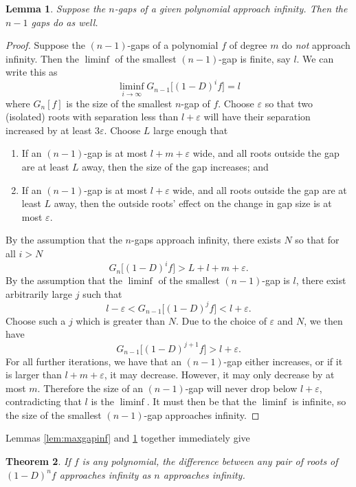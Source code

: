 \documentclass[11pt]{article}
\newtheorem{theorem}{Theorem}[section]
\newtheorem{lemma}[theorem]{Lemma}
\newcommand{\e}{\varepsilon}
\begin{document}
\begin{lemma}
\label{lem:gapinduction}
	Suppose the $n$-gaps of a given polynomial approach infinity. Then the $n-1$ gaps do as well.
\end{lemma}
\begin{proof}
	Suppose the $(n-1)$-gaps of a polynomial $f$ of degree $m$ do \emph{not} approach infinity. Then the $\liminf$ of the smallest $(n-1)$-gap is finite, say $l$. We can write this as
		\[ \liminf_{i\to\infty} G_{n-1}\big[(1-D)^i f\big] = l \]
	where $G_n[f]$ is the size of the smallest $n$-gap of $f$. Choose $\e$ so that two (isolated) roots with separation less than $l+\e$ will have their separation increased by at least $3\e$. Choose $L$ large enough that
	\begin{enumerate}
		\item If an $(n-1)$-gap is at most $l+m+\e$ wide, and all roots outside the gap are at least $L$ away, then the size of the gap increases; and
		\item If an $(n-1)$-gap is at most $l+\e$ wide, and all roots outside the gap are at least $L$ away, then the outside roots' effect on the change in gap size is at most $\e$.
	\end{enumerate}
	By the assumption that the $n$-gaps approach infinity, there exists $N$ so that for all $i>N$
		\[ G_n\big[(1-D)^i f\big] > L + l + m + \e. \]
	By the assumption that the $\liminf$ of the smallest $(n-1)$-gap is $l$, there exist arbitrarily large $j$ such that
		\[ l-\e < G_{n-1}\big[ (1-D)^j f\big] < l+\e. \]
	Choose such a $j$ which is greater than $N$. Due to the choice of $\e$ and $N$, we then have
		\[ G_{n-1}\big[ (1-D)^{j+1} f\big] > l+\e. \]
	For all further iterations, we have that an $(n-1)$-gap either increases, or if it is larger than $l+m+\e$, it may decrease. However, it may only decrease by at most $m$. Therefore the size of an $(n-1)$-gap will never drop below $l+\e$, contradicting that $l$ is the $\liminf$. It must then be that the $\liminf$ is infinite, so the size of the smallest $(n-1)$-gap approaches infinity.
\end{proof}

Lemmas \ref{lem:maxgapinf} and \ref{lem:gapinduction} together immediately give
\begin{theorem}
	If $f$ is any polynomial, the difference between any pair of roots of $(1-D)^n f$ approaches infinity as $n$ approaches infinity.
\end{theorem}
\end{document}
